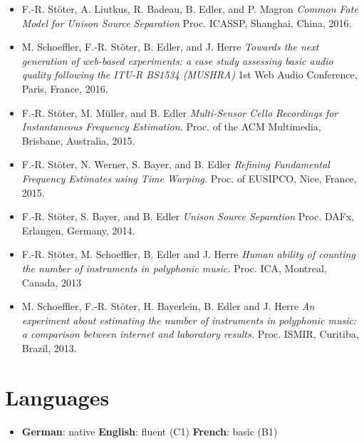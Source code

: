 \documentclass[a4paper,11pt]{article}
\newcommand{\resumeSubHeadingListStart}{\begin{itemize}[leftmargin=*]}
\newcommand{\resumeSubHeadingListEnd}{\end{itemize}}
\begin{document}
\begin{itemize}
{  Campaign} Proc. of Latent Variable Analysis and Signal Separation, Grenoble, France, 2017.
\item
  F.-R. Stöter, A. Liutkus, R. Badeau, B. Edler, and P. Magron
  \emph{Common Fate Model for Unison Source Separation} Proc. ICASSP, 
  Shanghai, China, 2016.
\item
  M. Schoeffler, F.-R. Stöter, B. Edler, and J. Herre \emph{Towards
  the next generation of web-based experiments: a case study assessing
  basic audio quality following the ITU-R BS1534
  (MUSHRA)} 1st Web Audio Conference, Paris, France, 2016.
\item
  F.-R. Stöter, M. Müller, and B. Edler
  \emph{Multi-Sensor Cello Recordings for Instantaneous Frequency
  Estimation.} Proc. of the ACM Multimedia, Brisbane, Australia, 2015.
\item
  F.-R. Stöter, N. Werner, S. Bayer, and B. Edler \emph{Refining
  Fundamental Frequency Estimates using Time Warping.} Proc. of
  EUSIPCO, Nice, France, 2015.
\item
  F.-R. Stöter, S. Bayer, and B. Edler \emph{Unison Source
  Separation} Proc. DAFx, Erlangen, Germany, 2014.
\item
  F.-R. Stöter, M. Schoeffler, B. Edler and J. Herre \emph{Human
  ability of counting the number of instruments in polyphonic music.}
  Proc. ICA, Montreal, Canada, 2013
\item
  M. Schoeffler, F.-R. Stöter, H. Bayerlein, B. Edler and J. Herre
  \emph{An experiment about estimating the number of instruments in
  polyphonic music: a comparison between internet and laboratory
  results.} Proc. ISMIR, Curitiba, Brazil, 2013.
\end{itemize}

\section{Languages}
\resumeSubHeadingListStart
  \item{
    \textbf{German}{: native}
    \textbf{English}{: fluent (C1)}
    \textbf{French}{: basic (B1)}
  }
\resumeSubHeadingListEnd
\end{document}
